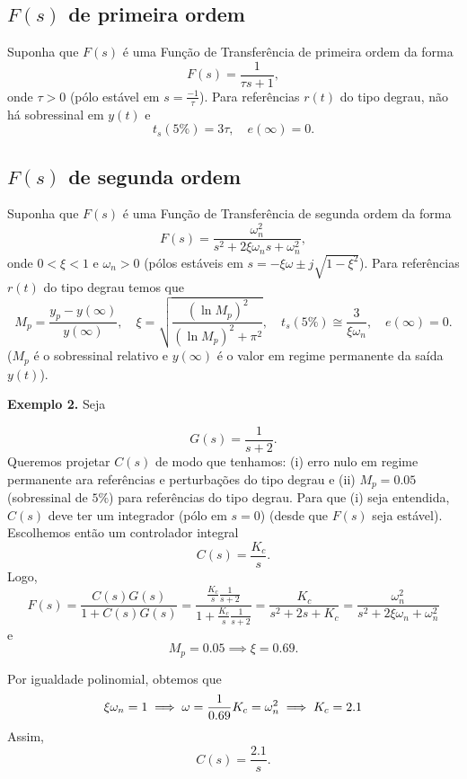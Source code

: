 \documentclass[
]{book}
\begin{document}
\hypertarget{fs-de-primeira-ordem}{%
\subsection*{\texorpdfstring{\(F(s)\) de primeira ordem}{F(s) de primeira ordem}}\label{fs-de-primeira-ordem}}

Suponha que \(F(s)\) é uma Função de Transferência de primeira ordem da forma
\[
F(s) = \frac{1}{\tau s+1},
\]
onde \(\tau > 0\) (pólo estável em \(s=\frac{-1}{\tau}\)). Para referências \(r(t)\) do tipo degrau, não há sobressinal em \(y(t)\) e
\[
\boxed{t_s(5\%) = 3\tau, \quad e(\infty) =0}.
\]

\hypertarget{fs-de-segunda-ordem}{%
\subsection*{\texorpdfstring{\(F(s)\) de segunda ordem}{F(s) de segunda ordem}}\label{fs-de-segunda-ordem}}

Suponha que \(F(s)\) é uma Função de Transferência de segunda ordem da forma
\[
F(s) = \frac{\omega_n^2}{s^2+2\xi\omega_ns+\omega_n^2},
\]
onde \(0<\xi<1\) e \(\omega_n>0\) (pólos estáveis em \(s=-\xi\omega \pm j \sqrt{1-\xi^2}\)). Para referências \(r(t)\) do tipo degrau temos que
\[
\boxed{M_p=\frac{y_p-y(\infty)}{y(\infty)}, \quad \xi=\sqrt{\frac{(\ln{M_p})^2}{(\ln{M_p})^2+\pi^2}}, \quad t_s(5\%) \cong \frac{3}{\xi\omega_n}, \quad e(\infty) =0}.
\]
(\(M_p\) é o sobressinal relativo e \(y(\infty)\) é o valor em regime permanente da saída \(y(t)\)).

\textbf{Exemplo 2.} Seja

\[
G(s) = \frac{1}{s+2}.
\]
Queremos projetar \(C(s)\) de modo que tenhamos: (i) erro nulo em regime permanente ara referências e perturbações do tipo degrau e (ii) \(M_p=0.05\) (sobressinal de \(5\%\)) para referências do tipo degrau. Para que (i) seja entendida, \(C(s)\) deve ter um integrador (pólo em \(s=0\)) (desde que \(F(s)\) seja estável). Escolhemos então um controlador integral
\[
C(s)=\frac{K_c}{s}.
\]
Logo,
\[
F(s) = \frac{C(s)G(s)}{1+C(s)G(s)} = \frac{\frac{K_c}{s}\frac{1}{s+2}}{1+\frac{K_c}{s}\frac{1}{s+2}} = \boxed{\frac{K_c}{s^2+2s+K_c} = \frac{\omega_n^2}{s^2+2\xi\omega_n+\omega^2_n}}
\]
e
\[
M_p=0.05 \implies \boxed{\xi = 0.69}.
\]

Por igualdade polinomial, obtemos que
\[
\xi\omega_n=1 \implies \omega = \frac{1}{0.69}\\
K_c=\omega_n^2 \implies K_c = 2.1
\]
Assim,
\[
\boxed{C(s)=\frac{2.1}{s}}.
\]
\end{document}

